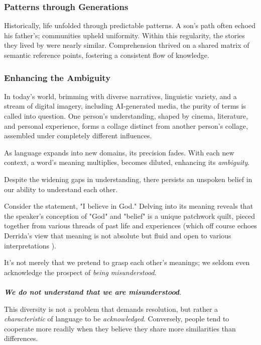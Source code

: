 \documentclass[11pt,a4]{article}
\begin{document}
    \subsubsection{Patterns through Generations}
        \par
        Historically, life unfolded through predictable patterns. A son's path often echoed his father's; communities upheld uniformity. Within this regularity, the stories they lived by were nearly similar. Comprehension thrived on a shared matrix of semantic reference points, fostering a consistent flow of knowledge.

    \subsubsection{Enhancing the Ambiguity}
        \par
        In today's world, brimming with diverse narratives, linguistic variety, and a stream of digital imagery, including AI-generated media, the purity of terms is called into question. One person's understanding, shaped by cinema, literature, and personal experience, forms a collage distinct from another person's collage, assembled under completely different influences.
        \par
        As language expands into new domains, its precision fades. With each new context, a word's meaning multiplies, becomes diluted, enhancing its \textit{ambiguity}.




        Despite the widening gaps in understanding, there persists an unspoken belief in our ability to understand each other.

        Consider the statement, "I believe in God." Delving into its meaning reveals that the speaker's conception of "God" and "belief" is a unique patchwork quilt, pieced together from various threads of past life and experiences (which off course echoes Derrida's view that meaning is not absolute but fluid and open to various interpretations \cite{Deconstruction}).

        \par
        It's not merely that we pretend to grasp each other's meanings; we seldom even acknowledge the prospect of \textit{being misunderstood}. \\
        \\
        \textit{\textbf{We do not understand that we are misunderstood}.}  \\

        \par
        This diversity is not a problem that demands resolution, but rather a \textit{characteristic} of language to be \textit{acknowledged}. Conversely, people tend to cooperate more readily when they believe they share more similarities than differences.
\end{document}
